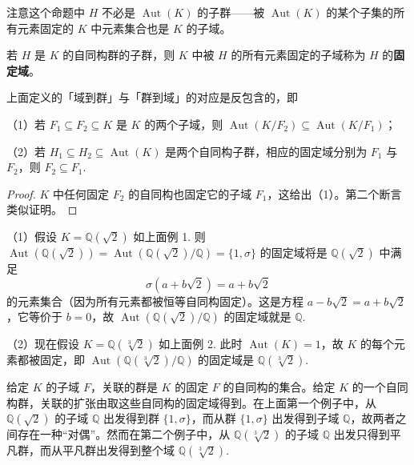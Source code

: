 注意这个命题中 \(H\) 不必是 \(\operatorname{Aut}(K)\) 的子群——被 \(\operatorname{Aut}(K)\) 的某个子集的所有元素固定的 \(K\) 中元素集合也是 \(K\) 的子域。

\begin{definition}
若 \(H\) 是 \(K\) 的自同构群的子群，则 \(K\) 中被 \(H\) 的所有元素固定的子域称为 \(H\) 的\textbf{固定域}。
\end{definition}

\begin{proposition}\label{pro:14.4}
上面定义的「域到群」与「群到域」的对应是反包含的，即

（1）若 \(F_1 \subseteq F_2 \subseteq K\) 是 \(K\) 的两个子域，则 \(\operatorname{Aut}(K/F_2) \subseteq \operatorname{Aut}(K/F_1)\)；

（2）若 \(H_1 \subseteq H_2 \subseteq \operatorname{Aut}(K)\) 是两个自同构子群，相应的固定域分别为 \(F_1\) 与 \(F_2\)，则 \(F_2 \subseteq F_1\).
\end{proposition}

\begin{proof}
\(K\) 中任何固定 \(F_2\) 的自同构也固定它的子域 \(F_1\)，这给出（1）。第二个断言类似证明。
\end{proof}

\begin{example}
（1）假设 \(K = \mathbb{Q}(\sqrt{2})\) 如上面例 1. 则 \(\operatorname{Aut}(\mathbb{Q}(\sqrt{2})) = \operatorname{Aut}(\mathbb{Q}(\sqrt{2})/\mathbb{Q}) = \{1, \sigma\}\) 的固定域将是 \(\mathbb{Q}(\sqrt{2})\) 中满足
\[
\sigma(a+b\sqrt{2}) = a+b\sqrt{2}
\]
的元素集合（因为所有元素都被恒等自同构固定）。这是方程 \(a-b\sqrt{2} = a+b\sqrt{2}\)，它等价于 \(b = 0\)，故 \(\operatorname{Aut}(\mathbb{Q}(\sqrt{2})/\mathbb{Q})\) 的固定域就是 \(\mathbb{Q}\).

（2）现在假设 \(K = \mathbb{Q}(\sqrt[3]{2})\) 如上面例 2. 此时 \(\operatorname{Aut}(K) = 1\)，故 \(K\) 的每个元素都被固定，即 \(\operatorname{Aut}(\mathbb{Q}(\sqrt[3]{2})/\mathbb{Q})\) 的固定域是 \(\mathbb{Q}(\sqrt[3]{2})\).
\end{example}

给定 \(K\) 的子域 \(F\)，关联的群是 \(K\) 的固定 \(F\) 的自同构的集合。给定 \(K\) 的一个自同构群，关联的扩张由取这些自同构的固定域得到。在上面第一个例子中，从 \(\mathbb{Q}(\sqrt{2})\) 的子域 \(\mathbb{Q}\) 出发得到群 \(\{1, \sigma\}\)，而从群 \(\{1, \sigma\}\) 出发得到子域 \(\mathbb{Q}\)，故两者之间存在一种“对偶”。然而在第二个例子中，从 \(\mathbb{Q}(\sqrt[3]{2})\) 的子域 \(\mathbb{Q}\) 出发只得到平凡群，而从平凡群出发得到整个域 \(\mathbb{Q}(\sqrt[3]{2})\).

